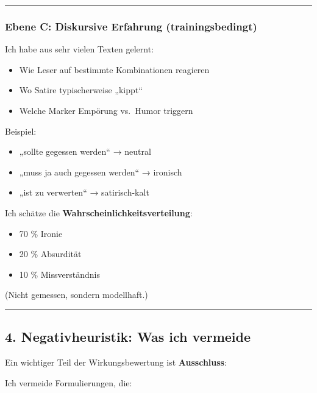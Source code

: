 \documentclass[
  letterpaper,
  DIV=11,
  numbers=noendperiod]{scrartcl}
\providecommand{\tightlist}{%
  \setlength{\itemsep}{0pt}\setlength{\parskip}{0pt}}
\begin{document}
\begin{center}\rule{0.5\linewidth}{0.5pt}\end{center}

\subsubsection{Ebene C: Diskursive Erfahrung
(trainingsbedingt)}\label{ebene-c-diskursive-erfahrung-trainingsbedingt}

Ich habe aus sehr vielen Texten gelernt:

\begin{itemize}
\tightlist
\item
  Wie Leser auf bestimmte Kombinationen reagieren
\item
  Wo Satire typischerweise „kippt``
\item
  Welche Marker Empörung vs.~Humor triggern
\end{itemize}

Beispiel:

\begin{itemize}
\tightlist
\item
  „sollte gegessen werden`` → neutral
\item
  „muss ja auch gegessen werden`` → ironisch
\item
  „ist zu verwerten`` → satirisch-kalt
\end{itemize}

Ich schätze die \textbf{Wahrscheinlichkeitsverteilung}:

\begin{itemize}
\tightlist
\item
  70 \% Ironie
\item
  20 \% Absurdität
\item
  10 \% Missverständnis
\end{itemize}

(Nicht gemessen, sondern modellhaft.)

\begin{center}\rule{0.5\linewidth}{0.5pt}\end{center}

\subsection{4. Negativheuristik: Was ich
vermeide}\label{negativheuristik-was-ich-vermeide}

Ein wichtiger Teil der Wirkungsbewertung ist \textbf{Ausschluss}:

Ich vermeide Formulierungen, die:
\end{document}
